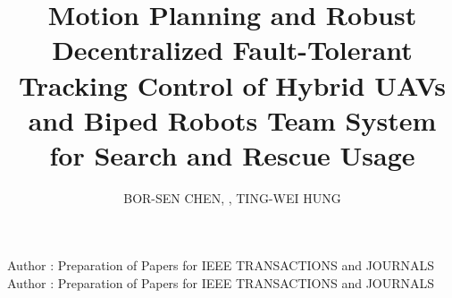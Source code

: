 \documentclass{ieeeaccess}
\begin{document}



\title{Motion Planning and Robust Decentralized Fault-Tolerant Tracking Control of Hybrid UAVs and Biped Robots Team System for Search and Rescue Usage}

\author{\uppercase{Bor-Sen Chen}, , \uppercase{Ting-Wei Hung}}

\address[1]{Department of Electrical Engineering, National Tsing Hua
University, Hsinchu 30013, Taiwan} \address[2]{Department of Electrical
Engineering, Yuan Ze University, Taoyuan 32003, Taiwan}


\markboth
{Author \headeretal: Preparation of Papers for IEEE TRANSACTIONS and JOURNALS}
{Author \headeretal: Preparation of Papers for IEEE TRANSACTIONS and JOURNALS}



\end{document}
